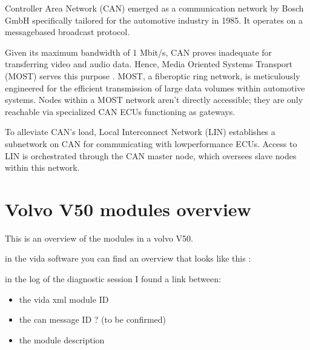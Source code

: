 \documentclass[letterpaper,10pt,english]{sphinxmanual}
\begin{document}
\sphinxAtStartPar
Controller Area Network (CAN) emerged as a communication network by Bosch GmbH specifically tailored for the automotive industry in 1985. It operates on a message\sphinxhyphen{}based broadcast protocol.

\sphinxAtStartPar
Given its maximum bandwidth of 1 Mbit/s, CAN proves inadequate for transferring video and audio data. Hence, Media Oriented Systems Transport (MOST) serves this purpose . MOST, a fiber\sphinxhyphen{}optic ring network, is meticulously engineered for the efficient transmission of large data volumes within automotive systems. Nodes within a MOST network aren’t directly accessible; they are only reachable via specialized CAN ECUs functioning as gateways.

\sphinxAtStartPar
To alleviate CAN’s load, Local Interconnect Network (LIN) establishes a sub\sphinxhyphen{}network on CAN for communicating with low\sphinxhyphen{}performance ECUs. Access to LIN is orchestrated through the CAN master node, which oversees slave nodes within this network.


\section{Volvo V50 modules overview}
\label{\detokenize{canbus/volvo-modules:volvo-v50-modules-overview}}\label{\detokenize{canbus/volvo-modules::doc}}
\sphinxAtStartPar
This is an overview of the modules in a volvo V50.

\sphinxAtStartPar
in the vida software you can find an overview that looks like this :

\noindent{}

\sphinxAtStartPar
in the log of the diagnostic session I found a link between:
\begin{itemize}
\item {} 
\sphinxAtStartPar
the vida xml module ID

\item {} 
\sphinxAtStartPar
the can message ID ? (to be confirmed)

\item {} 
\sphinxAtStartPar
the module description

\end{itemize}

\noindent{}
\end{document}
